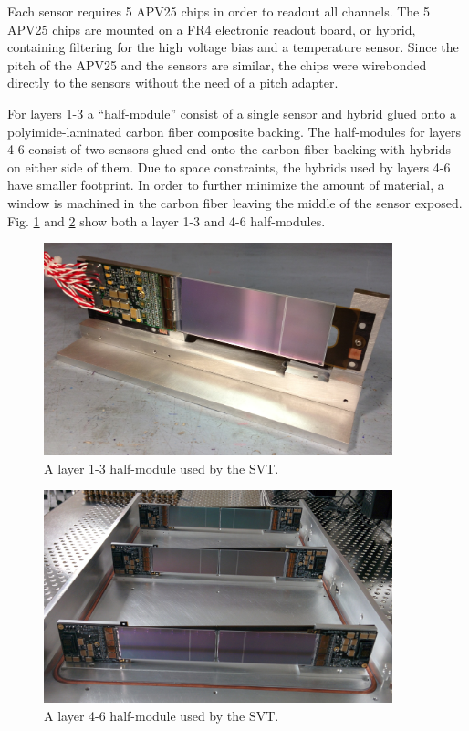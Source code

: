 Each sensor requires 5 APV25 chips in order to readout all channels.  The 5 
APV25 chips are mounted on a FR4 electronic readout board, or hybrid, containing
filtering for the high voltage bias and a temperature sensor.  Since the pitch
of the APV25 and the sensors are similar, the chips were wirebonded directly to
the sensors without the need of a pitch adapter.

For layers 1-3 a ``half-module'' consist of a single sensor and hybrid glued 
onto a polyimide-laminated carbon fiber composite backing.  The half-modules 
for layers 4-6 consist of two sensors glued end onto the carbon fiber backing 
with hybrids on either side of them.  Due to space constraints, the hybrids used
by layers 4-6 have smaller footprint.  In order to further minimize the 
amount of material, a window is machined in the carbon fiber leaving the middle
of the sensor exposed. Fig. \ref{fig:l13_hm} and \ref{fig:l46_hm} show both a layer 1-3 and 4-6 
half-modules.
\begin{figure}
    \centering
    \includegraphics[width=0.9\textwidth]{images/l13_half_module.jpg}
    \caption{A layer 1-3 half-module used by the SVT. }
    \label{fig:l13_hm}
\end{figure}
\begin{figure}
    \centering
    \includegraphics[width=0.9\textwidth]{images/l46_half_module.jpg}
    \caption{A layer 4-6 half-module used by the SVT. }
    \label{fig:l46_hm}
\end{figure}


